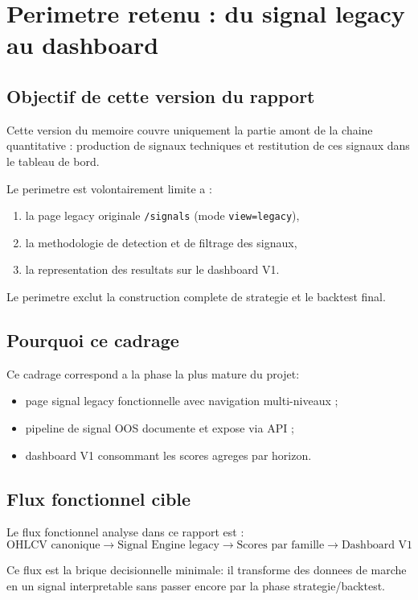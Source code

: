 \chapter{Perimetre retenu : du signal legacy au dashboard}

\section{Objectif de cette version du rapport}
Cette version du memoire couvre uniquement la partie amont de la chaine
quantitative : production de signaux techniques et restitution de ces signaux
dans le tableau de bord.

Le perimetre est volontairement limite a :
\begin{enumerate}
\item la page legacy originale \texttt{/signals} (mode \texttt{view=legacy}),
\item la methodologie de detection et de filtrage des signaux,
\item la representation des resultats sur le dashboard V1.
\end{enumerate}

Le perimetre exclut la construction complete de strategie et le backtest final.

\section{Pourquoi ce cadrage}
Ce cadrage correspond a la phase la plus mature du projet:
\begin{itemize}
\item page signal legacy fonctionnelle avec navigation multi-niveaux ;
\item pipeline de signal OOS documente et expose via API ;
\item dashboard V1 consommant les scores agreges par horizon.
\end{itemize}

\section{Flux fonctionnel cible}
Le flux fonctionnel analyse dans ce rapport est :
\[
\text{OHLCV canonique} \rightarrow \text{Signal Engine legacy}
\rightarrow \text{Scores par famille} \rightarrow \text{Dashboard V1}
\]

Ce flux est la brique decisionnelle minimale: il transforme des donnees de
marche en un signal interpretable sans passer encore par la phase
strategie/backtest.

